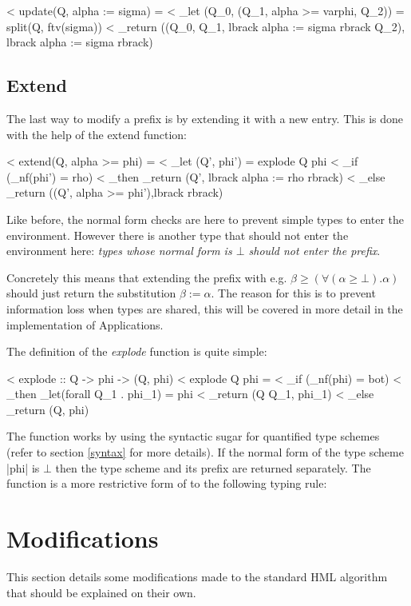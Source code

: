 < update(Q, alpha := sigma) =
<    _let (Q_0, (Q_1, alpha >= varphi, Q_2)) = split(Q, ftv(sigma))
<    _return ((Q_0, Q_1, lbrack alpha := sigma rbrack Q_2), lbrack alpha := sigma rbrack)

\subsection{Extend}
The last way to modify a prefix is by extending it with a new entry. This is done with the help of the extend function:

< extend(Q, alpha >= phi) = 
<    _let (Q', phi') = explode Q phi
<            _if  (_nf(phi') = rho)
<                 _then _return (Q', lbrack alpha := rho rbrack)
<                 _else _return ((Q', alpha >= phi'),lbrack rbrack)

Like before, the normal form checks are here to prevent simple types to enter the environment. However there is another type that should not enter the environment here: \emph{types whose normal form is $\bot$ should not enter the prefix}. 

Concretely this means that extending the prefix with e.g. $\beta \geq (\forall(\alpha \geq \bot).\alpha)$ should just return the substitution $\beta := \alpha$. The reason for this is to prevent information loss when types are shared, this will be covered in more detail in the implementation of Applications.

The definition of the \emph{explode} function is quite simple:

< explode :: Q -> phi -> (Q, phi)
< explode Q phi =
<    _if  (_nf(phi) = bot)
<         _then  _let(forall Q_1 . phi_1) = phi
<                _return (Q Q_1, phi_1)
<         _else _return (Q, phi)

The function works by using the syntactic sugar for quantified type schemes (refer to section \ref{syntax} for more details). If the normal form of the type scheme |phi| is $\bot$ then the type scheme and its prefix are returned separately. The function is a more restrictive form of to the following typing rule:

\begin{prooftree}
\end{prooftree}

\section{Modifications}
This section details some modifications made to the standard HML algorithm that should be explained on their own.
